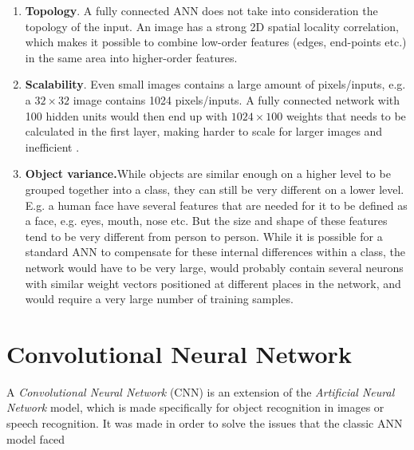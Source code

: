\begin{enumerate}

	\item \textbf{Topology}. A fully connected ANN does not take into consideration the topology of the input. An image has a strong 2D spatial locality correlation, which makes it possible to combine low-order features (edges, end-points etc.) in the same area into higher-order features.  
	
	\item \textbf{Scalability}. Even small images contains a large amount of pixels/inputs, e.g. a $ 32 \times 32 $ image contains 1024 pixels/inputs. A fully connected network with 100 hidden units would then end up with $ 1024 \times 100 $ weights that needs to be calculated in the first layer, making harder to scale for larger images and inefficient .
	
	\item \textbf{Object variance.}While objects are similar enough on a higher level to be grouped together into a class, they can still be very different on a lower level. E.g. a human face have several features that are needed for it to be defined as a face, e.g. eyes, mouth, nose etc. But the size and shape of these features tend to be very different from person to person. While it is possible for a standard ANN to compensate for these internal differences within a class, the network would have to be very large, would probably contain several neurons with similar weight vectors positioned at different places in the network, and would require a very large number of training samples. 
	
\end{enumerate}



\section{Convolutional Neural Network}\label{cnn}

A \textit{Convolutional Neural Network} \cite{LeCun1998} (CNN) is an extension of the \textit{Artificial Neural Network} model, which is made specifically for object recognition in images or speech recognition. It was made in order to solve the issues that the classic ANN model faced 


